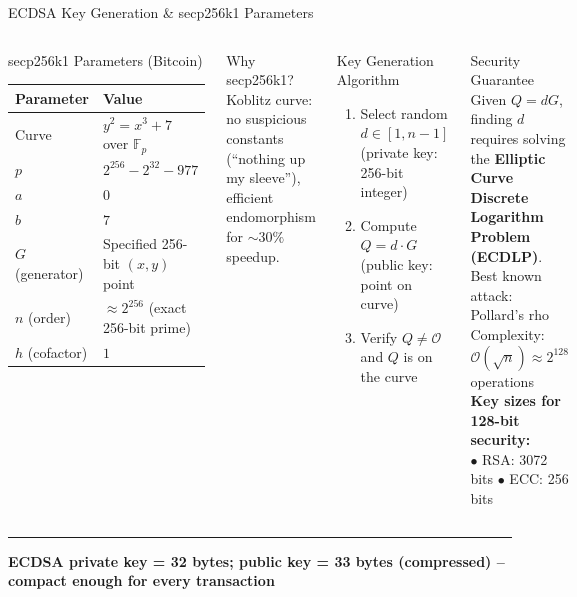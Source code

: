 \documentclass[8pt,aspectratio=169]{beamer}
\newcommand{\bottomnote}[1]{\vfill\vspace{-2mm}\textcolor{mllavender2}{\rule{\textwidth}{0.4pt}}\vspace{1mm}\footnotesize\textbf{#1}}
\begin{document}
\begin{frame}{ECDSA Key Generation \& secp256k1 Parameters}
\begin{columns}
\begin{block}{secp256k1 Parameters (Bitcoin)}
\scriptsize
\begin{tabular}{lp{5.5cm}}
\toprule
\textbf{Parameter} & \textbf{Value} \\
\midrule
Curve & $y^2 = x^3 + 7$ over $\mathbb{F}_p$ \\
$p$ & $2^{256} - 2^{32} - 977$ \\
$a$ & $0$ \\
$b$ & $7$ \\
$G$ (generator) & Specified 256-bit $(x,y)$ point \\
$n$ (order) & $\approx 2^{256}$ (exact 256-bit prime) \\
$h$ (cofactor) & $1$ \\
\bottomrule
\end{tabular}
\end{block}
\vspace{1mm}
\begin{alertblock}{Why secp256k1?}
\small Koblitz curve: no suspicious constants (``nothing up my sleeve''), efficient endomorphism for $\sim 30\%$ speedup.
\end{alertblock}
\begin{block}{Key Generation Algorithm}
\begin{enumerate}\small
  \item Select random $d \in [1, n-1]$ \\ (private key: 256-bit integer)
  \item Compute $Q = d \cdot G$ \\ (public key: point on curve)
  \item Verify $Q \neq \mathcal{O}$ and $Q$ is on the curve
\end{enumerate}
\end{block}
\vspace{1mm}
\begin{block}{Security Guarantee}
\small Given $Q = dG$, finding $d$ requires solving the \textbf{Elliptic Curve Discrete Logarithm Problem (ECDLP)}.\\[2mm]
Best known attack: Pollard's rho\\
Complexity: $\mathcal{O}(\sqrt{n}) \approx 2^{128}$ operations\\[2mm]
\textbf{Key sizes for 128-bit security:}\\
$\bullet$ RSA: 3072 bits \quad $\bullet$ ECC: 256 bits
\end{block}
\end{columns}
\bottomnote{ECDSA private key = 32 bytes; public key = 33 bytes (compressed) -- compact enough for every transaction}
\end{frame}
\end{document}
